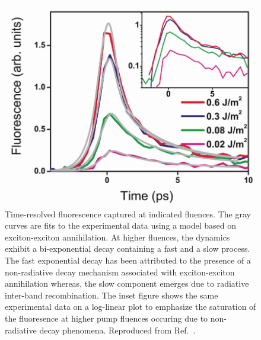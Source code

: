 \begin{figure}[ht]
	\centering
	\includegraphics[scale=0.25]{images/chapter_prior_works/fluorescence_wang_2004}
	\caption{Time-resolved fluorescence captured at indicated fluences. The gray curves are fits to the experimental data using a model based on exciton-exciton annihilation. At higher fluences, the dynamics exhibit a bi-exponential decay containing a fast and a slow process. The fast exponential decay has been attributed to the presence of a non-radiative decay mechanism associated with exciton-exciton annihilation whereas, the slow component emerges due to radiative inter-band recombination. The inset figure shows the same experimental data on a log-linear plot to emphasize the saturation of the fluoresence at higher pump fluences occuring due to non-radiative decay phenomena. Reproduced from Ref.\ \cite{wang2004observation}.}
	\label{fig:fluorescence_wang_2004}
\end{figure}

